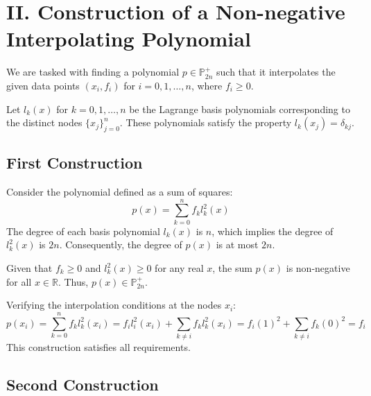 \documentclass[a4paper]{article}
\begin{document}
\section*{II. Construction of a Non-negative Interpolating Polynomial}

We are tasked with finding a polynomial $p \in \mathbb{P}_{2n}^+$ such that it interpolates the given data points $(x_i, f_i)$ for $i=0, 1, \dots, n$, where $f_i \ge 0$.

Let $l_k(x)$ for $k=0, 1, \dots, n$ be the Lagrange basis polynomials corresponding to the distinct nodes $\{x_j\}_{j=0}^n$. These polynomials satisfy the property $l_k(x_j) = \delta_{kj}$.

\subsection*{First Construction}

Consider the polynomial defined as a sum of squares:
\[
p(x) = \sum_{k=0}^{n} f_k l_k^2(x)
\]
The degree of each basis polynomial $l_k(x)$ is $n$, which implies the degree of $l_k^2(x)$ is $2n$. Consequently, the degree of $p(x)$ is at most $2n$.

Given that $f_k \ge 0$ and $l_k^2(x) \ge 0$ for any real $x$, the sum $p(x)$ is non-negative for all $x \in \mathbb{R}$. Thus, $p(x) \in \mathbb{P}_{2n}^+$.

Verifying the interpolation conditions at the nodes $x_i$:
\[
p(x_i) = \sum_{k=0}^{n} f_k l_k^2(x_i) = f_i l_i^2(x_i) + \sum_{k \neq i} f_k l_k^2(x_i) = f_i (1)^2 + \sum_{k \neq i} f_k (0)^2 = f_i
\]
This construction satisfies all requirements.

\subsection*{Second Construction}
\end{document}
